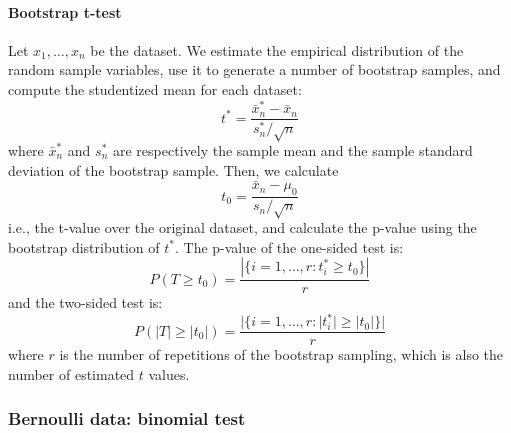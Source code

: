 \paragraph{Bootstrap t-test}
Let $x_1, \ldots, x_n$ be the dataset. We estimate the empirical distribution of the random sample variables, use it to generate a number of bootstrap samples, and compute the studentized mean for each dataset:
\begin{equation*}
    t^* = \frac{\bar{x}_n^* - \bar{x}_n}{s_n^* / \sqrt{n}}
\end{equation*}
where $\bar{x}_n^*$ and $s_n^*$ are respectively the sample mean and the sample standard deviation of the bootstrap sample. Then, we calculate
\begin{equation*}
    t_0 = \frac{\bar{x}_n - \mu_0}{s_n / \sqrt{n}}
\end{equation*}
i.e., the t-value over the original dataset, and calculate the p-value using the bootstrap distribution of $t^*$. The p-value of the one-sided test is:
\begin{equation*}
    P(T \geq t_0) = \frac{|\{i = 1, \ldots, r : t_i^* \geq t_0 \}|}{r}
\end{equation*}
and the two-sided test is:
\begin{equation*}
    P(|T| \geq |t_0|) = \frac{|\{i = 1, \ldots, r : |t_i^*| \geq |t_0| \}|}{r}
\end{equation*}
where $r$ is the number of repetitions of the bootstrap sampling, which is also the number of estimated $t$ values.

\subsubsection{Bernoulli data: binomial test}

